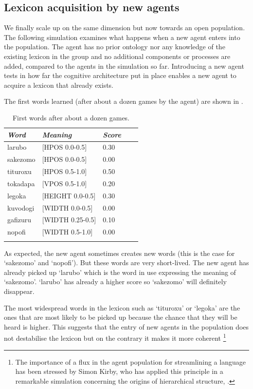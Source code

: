 \subsection{Lexicon acquisition by new agents}

We finally scale up on the same dimension but 
now towards an open population. The following 
simulation examines what happens when a new agent 
enters into the population. The agent has no 
prior ontology nor any knowledge of the existing
lexicon in the group and no additional components
or processes are added, compared to the agents
in the simulation so far. Introducing a new 
agent tests in how far the cognitive architecture
put in place enables a new agent to acquire a 
lexicon that already exists. 

The first words learned (after about a dozen 
games by the agent) are shown in . 


\begin{table}
\begin{center}
\begin{tabular}{ l  l  l  l  l }
\lsptoprule
{\itshape Word} & {\itshape Meaning} & {\itshape Score} \\ \midrule
larubo  & [HPOS 0.0-0.5] & 0.30 \\ 
sakezomo &  [HPOS 0.0-0.5] & 0.00 \\ 
tituroxu &  [HPOS 0.5-1.0] & 0.50 \\ 
tokadapa & [VPOS 0.5-1.0] & 0.20 \\ 
legoka   & [HEIGHT 0.0-0.5] & 0.30 \\ 
kuvodogi  & [WIDTH 0.0-0.5] & 0.00 \\ 
gafizuru &  [WIDTH 0.25-0.5] & 0.10  \\ 
nopofi  & [WIDTH 0.5-1.0] & 0.00 \\ 
\lspbottomrule
\end{tabular}
\caption{\label{tab:first} First words after about a dozen games.}
\end{center}
\end{table}

As expected, the new 
agent sometimes creates new words (this is the case 
for `sakezomo' and `nopofi'). But these words are 
very short-lived. The new agent has already picked up 
`larubo' which is the word in use expressing the 
meaning of `sakezomo'. `larubo' has already a higher 
score so `sakezomo' will definitely disappear. 

The most widespread words in the lexicon 
such as `tituroxu' or `legoka' are the ones that 
are most likely to be picked up because the chance
that they will be heard is higher. This suggests
that the entry of new agents in the population does
not destabilise the lexicon but on the contrary 
it makes it more coherent \footnote{The importance of a flux in the agent population for
streamlining a language has been stressed by Simon Kirby, who 
has applied this principle in a remarkable simulation 
concerning the origins of hierarchical structure, \cite{Kirby:1999}.}

